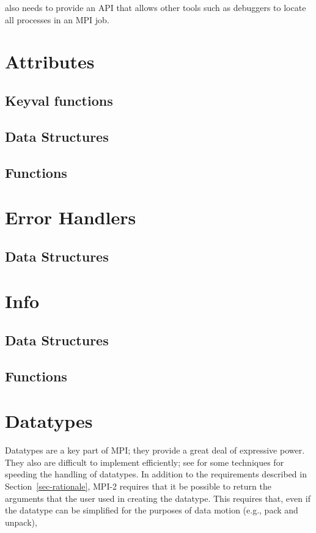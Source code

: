 \documentclass[dvipdfm]{article}
\begin{document}
 also needs to provide an API that allows other tools such as
debuggers to locate all processes in an MPI job.

\section{Attributes}


\subsection{Keyval functions}

\subsection{Data Structures}

\subsection{Functions}


\section{Error Handlers}
\subsection{Data Structures}


\section{Info}

\subsection{Data Structures}

\subsection{Functions}


\section{Datatypes}
Datatypes are a key part of MPI; they provide a great deal of expressive
power.  They also are difficult to implement efficiently; see 
\cite{gropp-swider-lusk99,Traeff:1999:FFE} for some techniques for speeding
the handling of datatypes.
In addition to the requirements described in Section~\ref{sec-rationale}, 
MPI-2 requires that it be possible to return the arguments that the user
used in creating the datatype.  This requires that, even if the datatype can
be simplified for the purposes of data motion (e.g., pack and unpack), 
\end{document}
